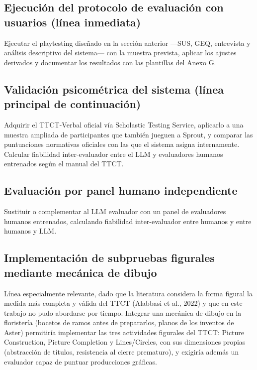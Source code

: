 \documentclass[12pt,twoside,titlepage]{report}
\begin{document}
\subsection{Ejecución del protocolo de evaluación con usuarios (línea inmediata)}

Ejecutar el playtesting diseñado en la sección anterior ---SUS, GEQ, entrevista y análisis descriptivo del sistema--- con la muestra prevista, aplicar los ajustes derivados y documentar los resultados con las plantillas del Anexo G.

\subsection{Validación psicométrica del sistema (línea principal de continuación)}

Adquirir el TTCT-Verbal oficial vía Scholastic Testing Service, aplicarlo a una muestra ampliada de participantes que también jueguen a Sprout, y comparar las puntuaciones normativas oficiales con las que el sistema asigna internamente. Calcular fiabilidad inter-evaluador entre el LLM y evaluadores humanos entrenados según el manual del TTCT.

\subsection{Evaluación por panel humano independiente}

Sustituir o complementar al LLM evaluador con un panel de evaluadores humanos entrenados, calculando fiabilidad inter-evaluador entre humanos y entre humanos y LLM.

\subsection{Implementación de subpruebas figurales mediante mecánica de dibujo}

Línea especialmente relevante, dado que la literatura considera la forma figural la medida más completa y válida del TTCT (Alabbasi et al., 2022) y que en este trabajo no pudo abordarse por tiempo. Integrar una mecánica de dibujo en la floristería (bocetos de ramos antes de prepararlos, planos de los inventos de Aster) permitiría implementar las tres actividades figurales del TTCT: Picture Construction, Picture Completion y Lines/Circles, con sus dimensiones propias (abstracción de títulos, resistencia al cierre prematuro), y exigiría además un evaluador capaz de puntuar producciones gráficas.
\end{document}
